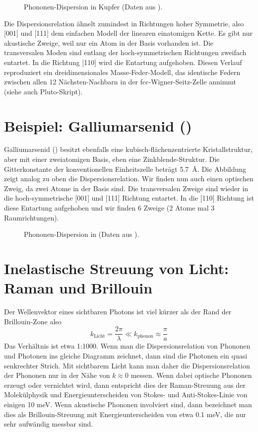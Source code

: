 	\begin{figure}
\caption{Phononen-Dispersion in Kupfer (Daten aus \cite{Svensson_cu}). \label{fig:phonon_kupfer}}
\end{figure}

Die Dispersionsrelation ähnelt zumindest in Richtungen hoher Symmetrie, also [001] und [111]	dem einfachen Modell der linearen einatomigen Kette. Es gibt nur akustische Zweige, weil nur ein Atom in der Basis vorhanden ist. Die transversalen Moden sind entlang der hoch-symmetrischen Richtungen zweifach entartet. In die Richtung [110] wird die Entartung aufgehoben. Diesen Verlauf reproduziert ein dreidimensionales Masse-Feder-Modell, das identische Federn zwischen allen 12 Nächsten-Nachbarn in der fcc-Wigner-Seitz-Zelle annimmt (siehe auch Pluto-Skript).

\section{Beispiel: Galliumarsenid ()}


Galliumarsenid () besitzt ebenfalls eine kubisch-flächenzentrierte Kristallstruktur, aber mit einer zweiatomigen Basis, eben eine Zinkblende-Struktur. Die Gitterkonstante der konventionellen Einheitszelle beträgt 5.7~\AA. Die Abbildung zeigt analog zu oben die Dispersionsrelation. Wir finden nun auch einen optischen Zweig, da zwei Atome in der Basis sind. Die transversalen Zweige sind wieder in die hoch-symmetrische [001] und [111] Richtung entartet. In die [110] Richtung ist diese Entartung aufgehoben und wir finden 6 Zweige (2 Atome mal 3 Raumrichtungen).


\begin{figure}
\caption{Phononen-Dispersion in  (Daten aus \cite{Strauch_gaas}).}
\end{figure}



\section{Inelastische Streuung von Licht: Raman und Brillouin}

Der Wellenvektor eines sichtbaren Photons ist viel kürzer als der Rand der Brillouin-Zone also
\begin{equation}
 k_\text{Licht} = \frac{2 \pi}{\lambda} \ll k_\text{phonon} \approx \frac{\pi}{a}
\end{equation}
Das Verhältnis ist etwa 1:1000. Wenn man die Dispersionsrelation von Phononen und Photonen ins gleiche Diagramm zeichnet, dann sind die Photonen ein quasi senkrechter Strich. Mit sichtbarem Licht kann man daher die Dispersionsrelation der Phononen nur in der Nähe von $k \approx 0$ messen. Wenn dabei optische Phononen erzeugt oder vernichtet wird, dann entspricht dies der Raman-Streuung aus der Molekülphysik und Energieunterscheiden von Stokes- und Anti-Stokes-Linie von einigen 10 meV. Wenn akustische Phononen involviert sind, dann bezeichnet man dies als Brillouin-Streuung mit Energieunterscheiden von etwa 0.1 meV, die nur sehr aufwändig messbar sind.


